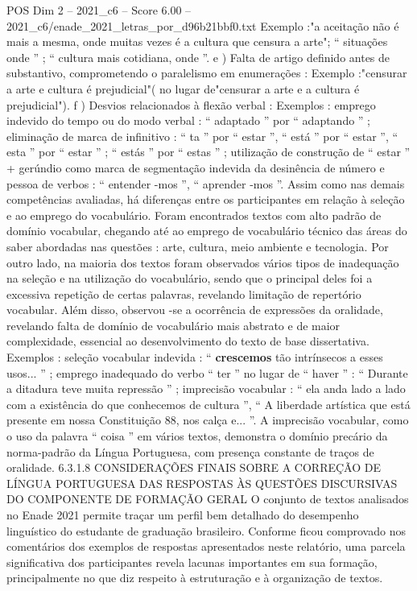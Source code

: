 \begin{textsample}{POS Dim 2 – 2021\_c6 – Score 6.00 – 2021\_c6/enade\_2021\_letras\_por\_d96b21bbf0.txt}
Exemplo :"a aceitação não é mais a mesma, onde muitas vezes é a cultura que censura a arte"; “ situações onde ” ; “ cultura mais cotidiana, onde ”. e ) Falta de artigo definido antes de substantivo, comprometendo o paralelismo em enumerações : Exemplo :"censurar a arte e cultura é prejudicial"( no lugar de"censurar a arte e a cultura é prejudicial"). f ) Desvios relacionados à flexão verbal : Exemplos : emprego indevido do tempo ou do modo verbal : “ adaptado ” por “ adaptando ” ; eliminação de marca de infinitivo : “ ta ” por “ estar ”, “ está ” por “ estar ”, “ esta ” por “ estar ” ; “ estás ” por “ estas ” ; utilização de construção de “ estar ” + gerúndio como marca de segmentação indevida da desinência de número e pessoa de verbos : “ entender -mos ”, “ aprender -mos ”.
Assim como nas demais competências avaliadas, há diferenças entre os participantes em relação à seleção e ao emprego do vocabulário.
Foram encontrados textos com alto padrão de domínio vocabular, chegando até ao emprego de vocabulário técnico das áreas do saber abordadas nas questões : arte, cultura, meio ambiente e tecnologia.
Por outro lado, na maioria dos textos foram observados vários tipos de inadequação na seleção e na utilização do vocabulário, sendo que o principal deles foi a excessiva repetição de certas palavras, revelando limitação de repertório vocabular.
Além disso, observou -se a ocorrência de expressões da oralidade, revelando falta de domínio de vocabulário mais abstrato e de maior complexidade, essencial ao desenvolvimento do texto de base dissertativa.
Exemplos : seleção vocabular indevida : “ \textbf{crescemos} tão intrínsecos a esses usos... ” ; emprego inadequado do verbo “ ter ” no lugar de “ haver ” : “ Durante a ditadura teve muita repressão ” ; imprecisão vocabular : “ ela anda lado a lado com a existência do que conhecemos de cultura ”, “ A liberdade artística que está presente em nossa Constituição 88, nos calça e... ”.
A imprecisão vocabular, como o uso da palavra “ coisa ” em vários textos, demonstra o domínio precário da norma-padrão da Língua Portuguesa, com presença constante de traços de oralidade. 6.3.1.8 CONSIDERAÇÕES FINAIS SOBRE A CORREÇÃO DE LÍNGUA PORTUGUESA DAS RESPOSTAS ÀS QUESTÕES DISCURSIVAS DO COMPONENTE DE FORMAÇÃO GERAL O conjunto de textos analisados no Enade 2021 permite traçar um perfil bem detalhado do desempenho linguístico do estudante de graduação brasileiro.
Conforme ficou comprovado nos comentários dos exemplos de respostas apresentados neste relatório, uma parcela significativa dos participantes revela lacunas importantes em sua formação, principalmente no que diz respeito à estruturação e à organização de textos.

\end{textsample}
